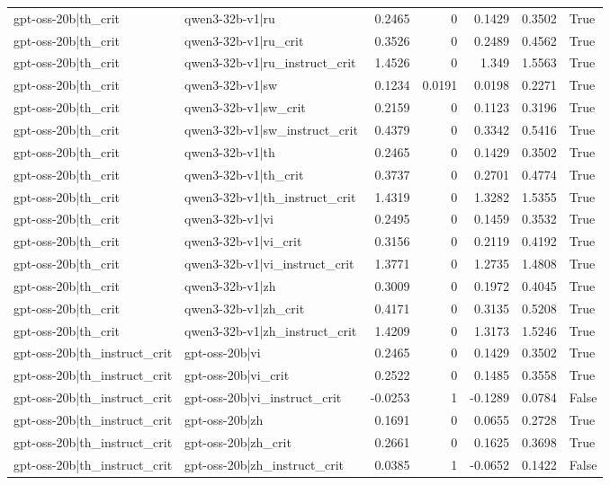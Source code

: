 \begin{table}
\begin{tabular}{l l r r r r l}
gpt-oss-20b|th_crit & qwen3-32b-v1|ru & 0.2465 & 0 & 0.1429 & 0.3502 & True \\
gpt-oss-20b|th_crit & qwen3-32b-v1|ru_crit & 0.3526 & 0 & 0.2489 & 0.4562 & True \\
gpt-oss-20b|th_crit & qwen3-32b-v1|ru_instruct_crit & 1.4526 & 0 & 1.349 & 1.5563 & True \\
gpt-oss-20b|th_crit & qwen3-32b-v1|sw & 0.1234 & 0.0191 & 0.0198 & 0.2271 & True \\
gpt-oss-20b|th_crit & qwen3-32b-v1|sw_crit & 0.2159 & 0 & 0.1123 & 0.3196 & True \\
gpt-oss-20b|th_crit & qwen3-32b-v1|sw_instruct_crit & 0.4379 & 0 & 0.3342 & 0.5416 & True \\
gpt-oss-20b|th_crit & qwen3-32b-v1|th & 0.2465 & 0 & 0.1429 & 0.3502 & True \\
gpt-oss-20b|th_crit & qwen3-32b-v1|th_crit & 0.3737 & 0 & 0.2701 & 0.4774 & True \\
gpt-oss-20b|th_crit & qwen3-32b-v1|th_instruct_crit & 1.4319 & 0 & 1.3282 & 1.5355 & True \\
gpt-oss-20b|th_crit & qwen3-32b-v1|vi & 0.2495 & 0 & 0.1459 & 0.3532 & True \\
gpt-oss-20b|th_crit & qwen3-32b-v1|vi_crit & 0.3156 & 0 & 0.2119 & 0.4192 & True \\
gpt-oss-20b|th_crit & qwen3-32b-v1|vi_instruct_crit & 1.3771 & 0 & 1.2735 & 1.4808 & True \\
gpt-oss-20b|th_crit & qwen3-32b-v1|zh & 0.3009 & 0 & 0.1972 & 0.4045 & True \\
gpt-oss-20b|th_crit & qwen3-32b-v1|zh_crit & 0.4171 & 0 & 0.3135 & 0.5208 & True \\
gpt-oss-20b|th_crit & qwen3-32b-v1|zh_instruct_crit & 1.4209 & 0 & 1.3173 & 1.5246 & True \\
gpt-oss-20b|th_instruct_crit & gpt-oss-20b|vi & 0.2465 & 0 & 0.1429 & 0.3502 & True \\
gpt-oss-20b|th_instruct_crit & gpt-oss-20b|vi_crit & 0.2522 & 0 & 0.1485 & 0.3558 & True \\
gpt-oss-20b|th_instruct_crit & gpt-oss-20b|vi_instruct_crit & -0.0253 & 1 & -0.1289 & 0.0784 & False \\
gpt-oss-20b|th_instruct_crit & gpt-oss-20b|zh & 0.1691 & 0 & 0.0655 & 0.2728 & True \\
gpt-oss-20b|th_instruct_crit & gpt-oss-20b|zh_crit & 0.2661 & 0 & 0.1625 & 0.3698 & True \\
gpt-oss-20b|th_instruct_crit & gpt-oss-20b|zh_instruct_crit & 0.0385 & 1 & -0.0652 & 0.1422 & False \\

\end{tabular}
\end{table}
